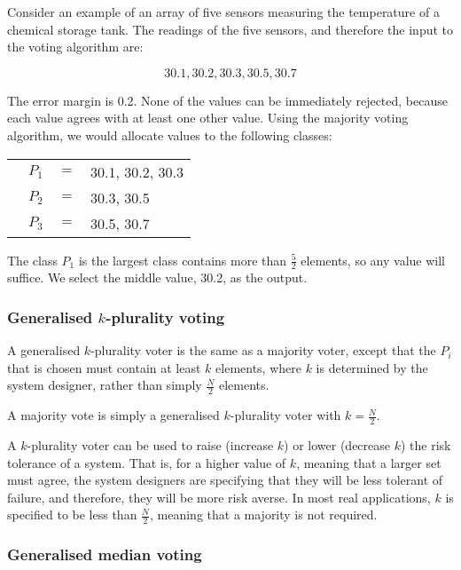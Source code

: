 \begin{example}
Consider an example of an array of five sensors measuring the temperature of a chemical storage tank. The readings of the five sensors, and therefore the input to the voting algorithm are: 

\[30.1, 30.2, 30.3, 30.5, 30.7\]

The error margin is 0.2. None of the values can be immediately rejected, because each value agrees with at least one other value. Using the majority voting algorithm, we would allocate values to the following classes:

\begin{tabular}{llll}
& \(P_1\) & $=$ & 30.1, 30.2, 30.3\\
& \(P_2\) & $=$ & 30.3, 30.5\\
& \(P_3\) & $=$ & 30.5, 30.7
\end{tabular}

The class \(P_1\) is the largest class contains more than \(\frac{5}{2}\) elements, so any value will suffice. We select the middle value, 30.2, as the output.

\end{example}

\subsubsection*{Generalised $k$-plurality voting}

A generalised \(k\)-plurality voter is the same as a majority voter, except that the \(P_i\) that is chosen must contain at least \(k\) elements, where \(k\) is determined by the system designer, rather than simply \(\frac{N}{2}\) elements.

A majority vote is simply a generalised \(k\)-plurality voter with \(k = \frac{N}{2}\).

A \(k\)-plurality voter can be used to raise (increase \(k\)) or lower (decrease \(k\)) the risk tolerance of a system. That is, for a higher value of \(k\), meaning that a larger set must agree, the system designers are specifying that they will be less tolerant of failure, and therefore, they will be more risk averse. In most real applications, \(k\) is specified to be less than \(\frac{N}{2}\), meaning that a majority is not required.

\subsubsection*{Generalised median voting}

